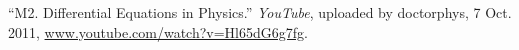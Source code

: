 \begin{thebibliography}{12}










“M2. Differential Equations in Physics.” \emph{YouTube}, uploaded by doctorphys, 7 Oct. 2011, \url{www.youtube.com/watch?v=Hl65dG6g7fg}.


\end{thebibliography}
